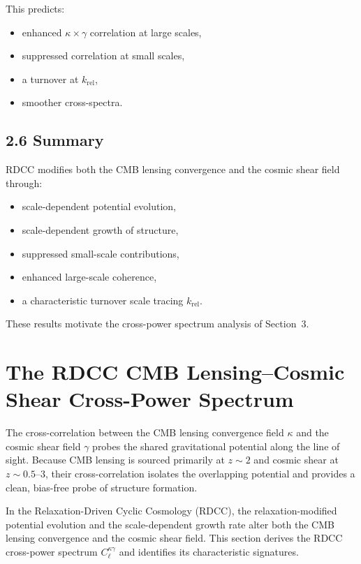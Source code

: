 \documentclass[11pt,a4paper]{article}
\begin{document}
This predicts:

\begin{itemize}
    \item enhanced $\kappa \times \gamma$ correlation at large scales,
    \item suppressed correlation at small scales,
    \item a turnover at $k_{\mathrm{rel}}$,
    \item smoother cross-spectra.
\end{itemize}

\subsection*{2.6 Summary}

RDCC modifies both the CMB lensing convergence and the cosmic shear field through:

\begin{itemize}
    \item scale-dependent potential evolution,
    \item scale-dependent growth of structure,
    \item suppressed small-scale contributions,
    \item enhanced large-scale coherence,
    \item a characteristic turnover scale tracing $k_{\mathrm{rel}}$.
\end{itemize}

These results motivate the cross-power spectrum analysis of Section~3.

\section{The RDCC CMB Lensing--Cosmic Shear Cross-Power Spectrum}

The cross-correlation between the CMB lensing convergence field $\kappa$ and the cosmic 
shear field $\gamma$ probes the shared gravitational potential along the line of sight. 
Because CMB lensing is sourced primarily at $z \sim 2$ and cosmic shear at 
$z \sim 0.5$--$3$, their cross-correlation isolates the overlapping potential and provides 
a clean, bias-free probe of structure formation.

In the Relaxation-Driven Cyclic Cosmology (RDCC), the relaxation-modified potential 
evolution and the scale-dependent growth rate alter both the CMB lensing convergence and 
the cosmic shear field. This section derives the RDCC cross-power spectrum 
$C_{\ell}^{\kappa\gamma}$ and identifies its characteristic signatures.
\end{document}
